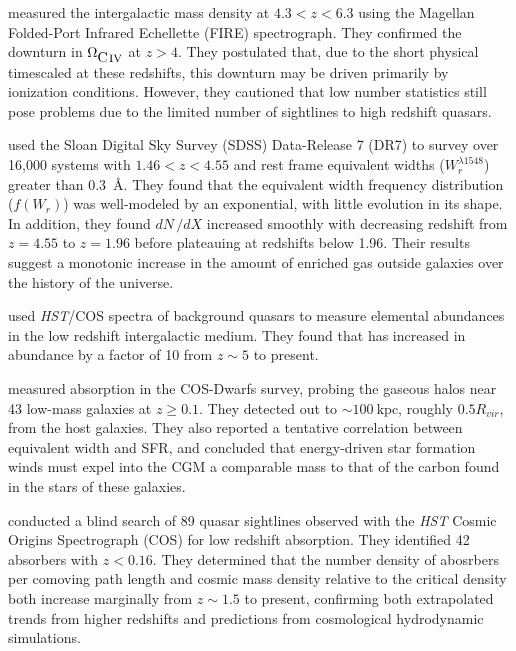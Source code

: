 \documentclass[linenumbers,twocolumn]{aastex61}
\begin{document}
\cite{Simcoe2011} measured the intergalactic {\CIV} mass density at $4.3 < z < 6.3$ using the Magellan Folded-Port Infrared Echellette (FIRE) spectrograph. They confirmed the downturn in $\Omega_{\hbox{{\rm C}\kern 0.1em{\sc iv}}}$ at $z > 4$. They postulated that, due to the short physical timescaled at these redshifts, this downturn may be driven primarily by ionization conditions. However, they cautioned that low number statistics still pose problems due to the limited number of sightlines to high redshift quasars.

\cite{Cooksey2013} used the Sloan Digital Sky Survey (SDSS) Data-Release 7 (DR7) to survey over 16,000 {\CIV} systems with $1.46 < z < 4.55$ and rest frame equivalent widths ($W_r^{\lambda1548}$) greater than $0.3$~{\AA}. They found that the equivalent width frequency distribution ($f(W_r)$) was well-modeled by an exponential, with little evolution in its shape. In addition, they found $dN\,/dX$ increased smoothly with decreasing redshift from $z = 4.55$ to $z = 1.96$ before plateauing at redshifts below 1.96. Their results suggest a monotonic increase in the amount of {\CIV} enriched gas outside galaxies over the history of the universe.

\cite{Shull2014} used {\it HST}/COS spectra of background quasars to measure elemental abundances in the low redshift intergalactic medium. They found that {\CIV} has increased in abundance by a factor of 10 from $z \sim 5$ to present.

\cite{Bordoloi2014} measured {\CIV} absorption in the COS-Dwarfs survey, probing the gaseous halos near 43 low-mass galaxies at $z \ge 0.1$. They detected {\CIV} out to $\sim 100~\mathrm{kpc}$, roughly $0.5 R_{vir}$, from the host galaxies. They also reported a tentative correlation between {\CIV} equivalent width and SFR, and concluded that energy-driven star formation winds must expel into the CGM a comparable mass to that of the carbon found in the stars of these galaxies.

\cite{Burchett2015} conducted a blind search of 89 quasar sightlines observed with the {\it HST} Cosmic Origins Spectrograph (COS) for low redshift {\CIV} absorption. They identified 42 absorbers with $z < 0.16$. They determined that the number density of {\CIV} abosrbers per comoving path length and cosmic mass density relative to the critical density both increase marginally from $z \sim 1.5$ to present, confirming both extrapolated trends from higher redshifts and predictions from cosmological hydrodynamic simulations.
\end{document}
